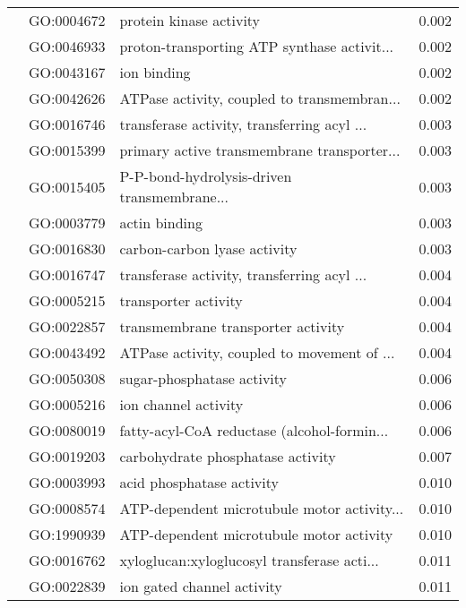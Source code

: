 \begin{longtable}{lllr}
   & GO:0004672 &                      protein kinase activity &         0.002 \\
   & GO:0046933 &  proton-transporting ATP synthase activit... &         0.002 \\
   & GO:0043167 &                                  ion binding &         0.002 \\
   & GO:0042626 &  ATPase activity, coupled to transmembran... &         0.002 \\
   & GO:0016746 &  transferase activity, transferring acyl ... &         0.003 \\
   & GO:0015399 &  primary active transmembrane transporter... &         0.003 \\
   & GO:0015405 &  P-P-bond-hydrolysis-driven transmembrane... &         0.003 \\
   & GO:0003779 &                                actin binding &         0.003 \\
   & GO:0016830 &                 carbon-carbon lyase activity &         0.003 \\
   & GO:0016747 &  transferase activity, transferring acyl ... &         0.004 \\
   & GO:0005215 &                         transporter activity &         0.004 \\
   & GO:0022857 &           transmembrane transporter activity &         0.004 \\
   & GO:0043492 &  ATPase activity, coupled to movement of ... &         0.004 \\
   & GO:0050308 &                   sugar-phosphatase activity &         0.006 \\
   & GO:0005216 &                         ion channel activity &         0.006 \\
   & GO:0080019 &  fatty-acyl-CoA reductase (alcohol-formin... &         0.006 \\
   & GO:0019203 &            carbohydrate phosphatase activity &         0.007 \\
   & GO:0003993 &                    acid phosphatase activity &         0.010 \\
   & GO:0008574 &  ATP-dependent microtubule motor activity... &         0.010 \\
   & GO:1990939 &     ATP-dependent microtubule motor activity &         0.010 \\
   & GO:0016762 &  xyloglucan:xyloglucosyl transferase acti... &         0.011 \\
   & GO:0022839 &                   ion gated channel activity &         0.011 \\

\end{longtable}
